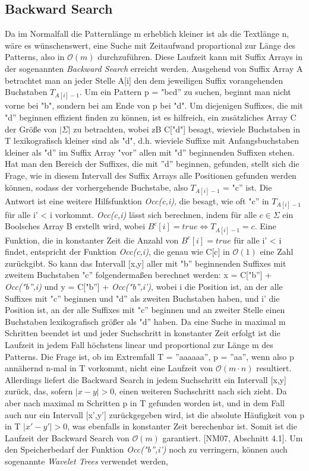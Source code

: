 \documentclass[12pt,twoside]{article}
\begin{document}
\subsection{Backward Search}
Da im Normalfall die Patternlänge m erheblich kleiner ist als die Textlänge n, wäre es wünschenswert, eine Suche mit Zeitaufwand propartional zur Länge des Patterns, also in $\mathcal{O}(m)$ durchzuführen. Diese Laufzeit kann mit Suffix Arrays in der sogenannten \textit{Backward Search} erreicht werden. Ausgehend von Suffix Array A betrachtet man an jeder Stelle A[i] den dem jeweiligen Suffix vorangehenden Buchstaben $T_{A[i]-1}$. Um ein Pattern p = "bcd'' zu suchen, beginnt man nicht vorne bei "b", sondern bei am Ende von p bei "d". Um diejenigen Suffixes, die mit "d'' beginnen effizient finden zu können, ist es hilfreich, ein zusätzliches Array C der Größe von $\vert \Sigma \vert$ zu betrachten, wobei zB C["d"] besagt, wieviele Buchstaben in T lexikografisch kleiner sind als "d", d.h. wieviele Suffixe mit Anfangsbuchstaben kleiner als "d'' im Suffix Array "vor'' allen mit "d'' beginnenden Suffixen stehen. Hat man den Bereich der Suffixes, die mit ''d'' beginnen, gefunden, stellt sich die Frage, wie in diesem Intervall des Suffix Arrays alle Positionen gefunden werden können, sodass der vorhergehende Buchstabe, also $T_{A[i]-1}$ = "c'' ist. Die Antwort ist eine weitere Hilfsfunktion \textit{Occ(c,i)}, die besagt, wie oft "c'' in $T_{A[i]-1}$ für alle i' < i vorkommt. \textit{Occ(c,i)} lässt sich berechnen, indem für alle $c \in \Sigma$ ein Boolsches Array B erstellt wird, wobei $B^{c}[i] = true \Leftrightarrow T_{A[i]-1} = c$. Eine Funktion, die in konstanter Zeit die Anzahl von $B^{c}[i] = true$ für alle i' < i findet, entspricht der Funktion \textit{Occ(c,i)}, die genau wie C[c] in $\mathcal{O}(1)$ eine Zahl zurückgibt. So kann das Intervall [x,y] aller mit "b'' beginnenden Suffixes mit zweitem Buchstaben "c'' folgendermaßen berechnet werden: x = C["b''] + \textit{Occ("b'',i)} und y = C["b''] + \textit{Occ("b'',i')}, wobei i die Position ist, an der alle Suffixes mit "c'' beginnen und "d'' als zweiten Buchstaben haben, und i' die Position ist, an der alle Suffixes mit "c'' beginnen und an zweiter Stelle einen Buchstaben lexikografisch größer als "d'' haben. Da eine Suche in maximal m Schritten beendet ist und jeder Suchschritt in konstanter Zeit erfolgt ist die Laufzeit in jedem Fall höchstens linear und proportional zur Länge m des Patterns. Die Frage ist, ob im Extremfall T = ''aaaaaa'', p = ''aa'', wenn also p annähernd n-mal in T vorkommt, nicht eine Laufzeit von $\mathcal{O}(m \cdot n)$ resultiert. Allerdings liefert die Backward Search in jedem Suchschritt ein Intervall [x,y] zurück, das, sofern $\vert x-y \vert > 0$, einen weiteren Suchschritt nach sich zieht. Da aber nach maximal m Schritten p in T gefunden worden ist, und in dem Fall auch nur ein Intervall [x',y'] zurückgegeben wird, ist die absolute Häufigkeit von p in T $\vert x'-y' \vert > 0$, was ebenfalls in konstanter Zeit berechenbar ist. Somit ist die Laufzeit der Backward Search von $\mathcal{O}(m)$ garantiert. [NM07, Abschnitt 4.1]. Um den Speicherbedarf der Funktion \textit{Occ("b'',i')} noch zu verringern, können auch sogenannte \textit{Wavelet Trees} verwendet werden, 
\end{document}
